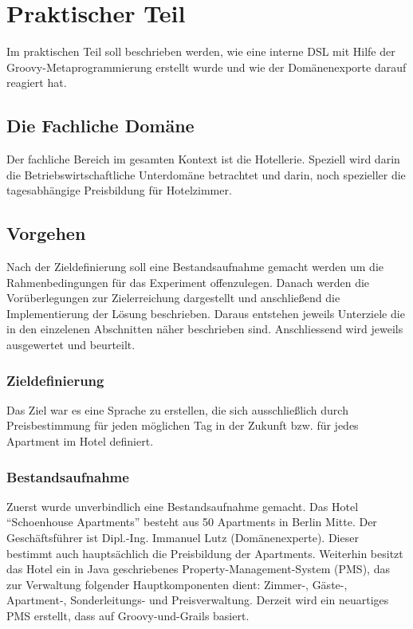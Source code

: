 \documentclass[11pt,english,ngerman, headsepline]{scrreprt}
\begin{document}
 
 
\chapter{Praktischer Teil}

Im praktischen Teil soll beschrieben werden, wie eine interne DSL mit Hilfe der
Groovy-Metaprogrammierung erstellt wurde und wie der Domänenexporte darauf
reagiert hat. 

\section{Die Fachliche Domäne}
Der fachliche Bereich im gesamten Kontext ist die Hotellerie. Speziell wird
darin die Betriebswirtschaftliche Unterdomäne betrachtet und darin, noch
spezieller die tagesabhängige Preisbildung für Hotelzimmer.

\section{Vorgehen}
Nach der Zieldefinierung soll eine Bestandsaufnahme gemacht werden um die
Rahmenbedingungen für das Experiment offenzulegen. Danach werden die
Vorüberlegungen zur Zielerreichung dargestellt und anschließend die
Implementierung der Lösung beschrieben. Daraus entstehen jeweils Unterziele die
in den einzelenen Abschnitten näher beschrieben sind. Anschliessend wird jeweils
ausgewertet und beurteilt.

\subsection{Zieldefinierung}
Das Ziel war es eine Sprache zu erstellen, die sich ausschließlich durch
Preisbestimmung für jeden möglichen Tag in der Zukunft bzw. für jedes Apartment
im Hotel definiert.

\subsection{Bestandsaufnahme}
Zuerst wurde unverbindlich eine Bestandsaufnahme gemacht. Das Hotel
``Schoenhouse Apartments'' besteht aus 50 Apartments in Berlin Mitte. Der
Geschäftsführer ist Dipl.-Ing. Immanuel Lutz (Domänenexperte). Dieser bestimmt
auch hauptsächlich die Preisbildung der Apartments. Weiterhin besitzt das Hotel ein in Java
geschriebenes Property-Management-System (PMS), das zur Verwaltung folgender
Hauptkomponenten dient: Zimmer-, Gäste-, Apartment-, Sonderleitungs- und
Preisverwaltung.
Derzeit wird ein neuartiges PMS erstellt, dass auf Groovy-und-Grails basiert.
 
\end{document}
